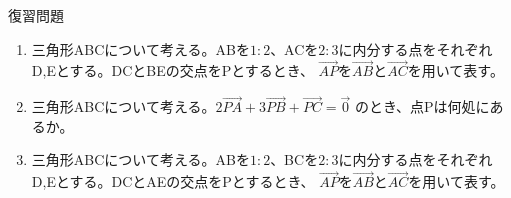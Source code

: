 \documentclass[12pt,a4paper]{jsarticle}
\begin{document}
復習問題
\begin{enumerate}
    \item 三角形ABCについて考える。ABを$1:2$、ACを$2:3$に内分する点をそれぞれD,Eとする。DCとBEの交点をPとするとき、
    $\overrightarrow{AP}$を$\overrightarrow{AB}$と$\overrightarrow{AC}$を用いて表す。
    \item 三角形ABCについて考える。$2\overrightarrow{PA}+3\overrightarrow{PB}+\overrightarrow{PC}=\overrightarrow{0}$
    のとき、点Pは何処にあるか。
    \item 三角形ABCについて考える。ABを$1:2$、BCを$2:3$に内分する点をそれぞれD,Eとする。DCとAEの交点をPとするとき、
    $\overrightarrow{AP}$を$\overrightarrow{AB}$と$\overrightarrow{AC}$を用いて表す。
\end{enumerate}
\end{document}
